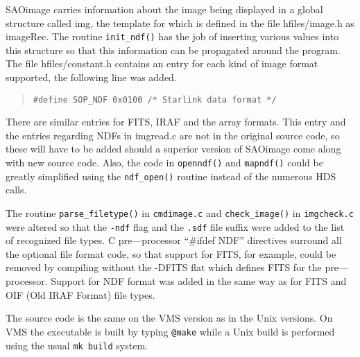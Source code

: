 SAOimage carries information about the image being displayed in a global
structure called img, the template for which is defined in the file
hfiles/image.h as imageRec. The routine {\tt init\_ndf()} has the job of
inserting various values into this structure so that this information can
be propagated around the program. The file hfiles/constant.h contains an
entry for
each kind of image format supported, the following line was added.
\begin{quote}
{\tt \#define SOP\_NDF         0x0100          /* Starlink data format */}
\end{quote}
There are similar entries for FITS, IRAF and the array formats. This
entry and the entries regarding NDFs in imgread.c are not in the original
source code, so these will have to be added should a superior version of
SAOimage come along with new source code. Also, the code in {\tt openndf()}
and
{\tt mapndf()} could be greatly simplified using the {\tt ndf\_open()}
routine instead of
the numerous HDS calls.

The routine {\tt parse\_filetype()} in {\tt cmdimage.c} and
{\tt check\_image()} in
{\tt imgcheck.c} were altered so that the {\tt -ndf} flag and the {\tt .sdf}
file
suffix were added to the list of recognized file types. C
pre---processor ``\#ifdef NDF'' directives surround all the optional file
format code, so that support for FITS, for example, could be removed
by compiling without the -DFITS flat which defines FITS for the
pre---processor. Support for NDF format was added in the same way as
for FITS and OIF (Old IRAF Format) file types.

The source code is the same on the VMS version as in the Unix
versions. On VMS the executable is built by typing {\tt @make} while a
Unix build is performed using the usual {\tt mk build} system.



